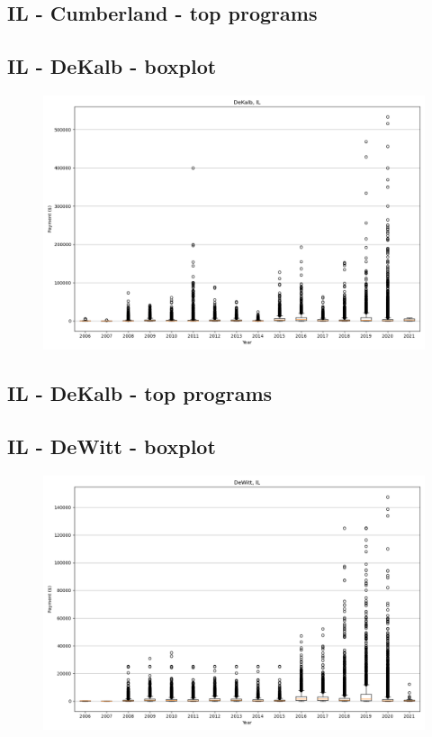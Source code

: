 \subsection*{IL - Cumberland - top programs}

\newpage
\subsection*{IL - DeKalb - boxplot}
\begin{figure}[h]
\centering
\includegraphics[width=7in]{../output/boxplots/counties/DeKalb-IL_boxplot.png}
\end{figure}


\subsection*{IL - DeKalb - top programs}

\newpage
\subsection*{IL - DeWitt - boxplot}
\begin{figure}[h]
\centering
\includegraphics[width=7in]{../output/boxplots/counties/DeWitt-IL_boxplot.png}
\end{figure}


